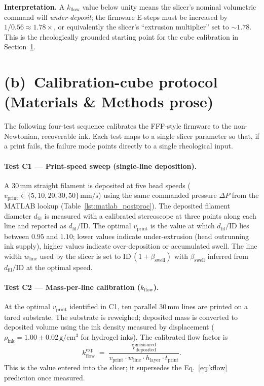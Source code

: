 \documentclass[11pt,a4paper]{article}
\newcommand{\mms}{\,\mathrm{mm/s}}
\begin{document}
\noindent\textbf{Interpretation.} A $k_\mathrm{flow}$ value below unity means the
slicer's nominal volumetric command will \emph{under-deposit}; the firmware E-steps
must be increased by $1/0.56 \approx 1.78\times$, or equivalently the slicer's
``extrusion multiplier'' set to $\sim 1.78$. This is the rheologically grounded
starting point for the cube calibration in Section~\ref{sec:calibration}.

\section{(b)~Calibration-cube protocol (Materials \& Methods prose)}
\label{sec:calibration}

The following four-test sequence calibrates the FFF-style firmware to the
non-Newtonian, recoverable ink. Each test maps to a single slicer parameter so
that, if a print fails, the failure mode points directly to a single rheological
input.

\paragraph{Test C1 --- Print-speed sweep (single-line deposition).}
A $30\,\mathrm{mm}$ straight filament is deposited at five head speeds
($v_\mathrm{print}\in\{5,10,20,30,50\}\mms$) using the same commanded pressure
$\Delta P$ from the MATLAB lookup (Table~\ref{lst:matlab_postproc}). The deposited
filament diameter $d_\mathrm{fil}$ is measured with a calibrated stereoscope at
three points along each line and reported as
$d_\mathrm{fil}/\mathrm{ID}$. The optimal $v_\mathrm{print}$ is the value at which
$d_\mathrm{fil}/\mathrm{ID}$ lies between $0.95$ and $1.10$; lower values indicate
under-extrusion (head outrunning ink supply), higher values indicate
over-deposition or accumulated swell. The line width $w_\mathrm{line}$ used by the
slicer is set to $\mathrm{ID}\,(1+\beta_\mathrm{swell})$ with $\beta_\mathrm{swell}$
inferred from $d_\mathrm{fil}/\mathrm{ID}$ at the optimal speed.

\paragraph{Test C2 --- Mass-per-line calibration ($k_\mathrm{flow}$).}
At the optimal $v_\mathrm{print}$ identified in C1, ten parallel $30\,\mathrm{mm}$
lines are printed on a tared substrate. The substrate is reweighed; deposited mass
is converted to deposited volume using the ink density measured by displacement
($\rho_\mathrm{ink}=1.00\pm 0.02\,\mathrm{g/cm^3}$ for hydrogel inks). The
calibrated flow factor is
\begin{equation}
k_\mathrm{flow}^\mathrm{exp}
\;=\;
\frac{V_\mathrm{deposited}^\mathrm{measured}}
     {v_\mathrm{print}\cdot w_\mathrm{line}\cdot h_\mathrm{layer}\cdot t_\mathrm{print}}.
\end{equation}
This is the value entered into the slicer; it supersedes the Eq.~\ref{eq:kflow}
prediction once measured.
\end{document}
